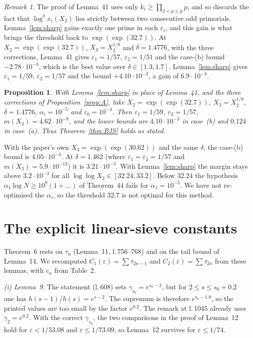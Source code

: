 \documentclass[11pt,a4paper]{amsart}
\newtheorem{proposition}[theorem]{Proposition}
\theoremstyle{remark}
\newtheorem*{remark*}{Remark}
\newcommand{\eps}{\varepsilon}
\begin{document}
\begin{remark*}
The proof of Lemma~41 uses only $k_i\ge\prod_{2<p\le\bar p}p$, and so discards the fact that
$\log^{\delta}x_i(X_2)$ lies strictly between two consecutive odd primorials. Lemma~\ref{lem:sharp} gains
exactly one prime in each $\eps_i$, and this gain is what brings the threshold back to $\exp(\exp(32.7))$. At
$X_2=\exp(\exp(32.7))$, $X_3=X_2^{1/8}$ and $\delta=1.4776$, with the three corrections, Lemma~41 gives
$\eps_1=1/57$, $\eps_2=1/51$ and the case-(b) bound $-2.78\cdot10^{-3}$, which is the best value over
$\delta\in[1.3,1.7]$. Lemma~\ref{lem:sharp} gives $\eps_1=1/59$, $\eps_2=1/57$ and the bound
$+4.10\cdot10^{-3}$, a gain of $6.9\cdot10^{-3}$.
\end{remark*}

\begin{proposition}\label{prop:B}
With Lemma~\ref{lem:sharp} in place of Lemma~41, and the three corrections of Proposition~\ref{prop:A}, take
$X_2=\exp(\exp(32.7))$, $X_3=X_2^{1/8}$, $\delta=1.4776$, $\alpha_i=10^{-5}$ and $\eps_0=10^{-4}$. Then
$\eps_1=1/59$, $\eps_2=1/57$, $m(X_3)=4.62\cdot10^{-9}$, and the lower bounds are $4.10\cdot10^{-3}$ in case~(b)
and $0.124$ in case~(a). Thus Theorem~\ref{thm:BJS} holds as stated.
\end{proposition}

With the paper's own $X_3=\exp(\exp(30.62))$ and the same $\delta$, the case-(b) bound is $4.05\cdot10^{-3}$.
At $\delta=1.462$ (where $\eps_1=\eps_2=1/57$ and $m(X_3)=5.9\cdot10^{-12}$) it is $3.21\cdot10^{-3}$. With
Lemma~\ref{lem:sharp} the margin stays above $3.2\cdot10^{-3}$ for all $\log\log X_2\in[32.24,33.2]$. Below $32.24$
the hypothesis $\alpha_1\log N\ge10^9(1+\dots)$ of Theorem~44 fails for $\alpha_1=10^{-5}$. We have not
re-optimised the $\alpha_i$, so the threshold $32.7$ is not optimal for this method.

\section{The explicit linear-sieve constants}\label{sec:sieve}

Theorem~6 rests on $\tau_n$ (Lemma~11, l.\,756--768) and on the tail bound of Lemma~14. We recomputed
$C_1(\eps)=\sum\tau_{2n-1}$ and $C_2(\eps)=\sum\tau_{2n}$ from these lemmas, with $c_n$ from Table~2.

\emph{(i) Lemma~9.} The statement (l.\,608) sets $\gamma_{s_0}=e^{s_0-2}$, but for $2\le s\le s_0+0.2$ one has
$h(s-1)/h(s)=e^{s-2}$. The supremum is therefore $e^{s_0-1.8}$, so the printed values are too small by the factor $e^{0.2}$. The remark at
l.\,1045 already uses $\gamma_2=e^{0.2}$. With the correct $\gamma_{s_0}$, the two comparisons in the proof of
Lemma~12 hold for $\eps<1/53.08$ and $\eps\le1/73.09$, so Lemma~12 survives for $\eps\le1/74$.
\end{document}
